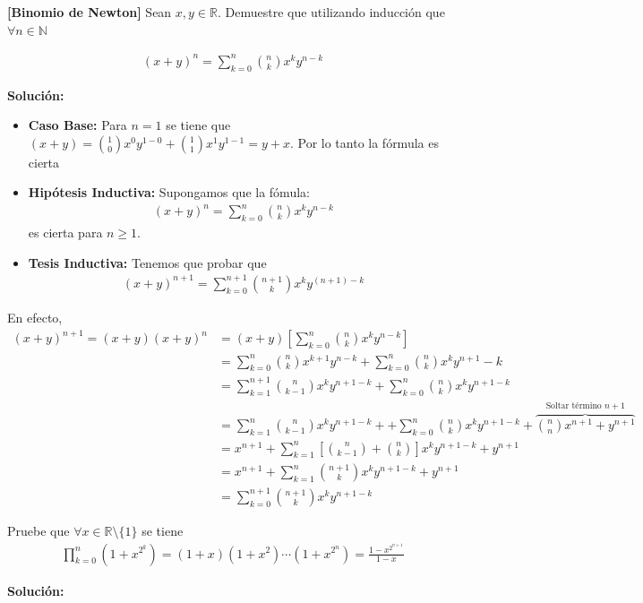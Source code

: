 \documentclass[12pt]{book}
\begin{document}
\begin{prob}{}{}
\textbf{[Binomio de Newton]} Sean $x,y \in \mathbb{R}$. Demuestre que utilizando inducción que  $\forall n \in \mathbb{N}$ 

\begin{align*}
    (x+y)^n=\sum_{k=0}^n\binom{n}{k}x^ky^{n-k}
\end{align*}
\end{prob}
\textbf{Solución:}
\begin{itemize}
    \item \textbf{Caso Base:} Para $n=1$ se  tiene que $(x+y)=\binom{1}{0}x^0y^{1-0}+\binom{1}{1}x^1y^{1-1}=y+x$. Por lo tanto la fórmula es cierta 

    \item \textbf{Hipótesis Inductiva:} Supongamos que la fómula: 
    \begin{align*}
    (x+y)^n=\sum_{k=0}^n\binom{n}{k}x^ky^{n-k}
\end{align*}
es cierta para $n\geq 1$.

\item \textbf{Tesis Inductiva:} Tenemos que probar que 
\begin{align*}
    (x+y)^{n+1}=\sum_{k=0}^{n+1}\binom{n+1}{k}x^ky^{(n+1)-k}
\end{align*}
\end{itemize}
En efecto,
\begin{align*}
    (x+y)^{n+1}=(x+y)(x+y)^n&=(x+y)\left[\sum_{k=0}^n\binom{n}{k}x^ky^{n-k}\right] \\
    &=\sum_{k=0}^n\binom{n}{k}x^{k+1}y^{n-k}+\sum_{k=0}^n
\binom{n}{k}x^ky^{n+1}-k \\
&=\sum_{k=1}^{n+1}\binom{n}{k-1}x^ky^{n+1-k}+\sum_{k=0}^n\binom{n}{k}x^ky^{n+1-k} \\
&=\sum_{k=1}^n\binom{n}{k-1}x^ky^{n+1-k}+ +\sum_{k=0}^n\binom{n}{k}x^ky^{n+1-k}+ \overbrace{\binom{n}{n}x^{n+1}+y^{n+1}}^{\text{Soltar término $n+1$}}\\
&=x^{n+1}+\sum_{k=1}^{n}\left[\binom{n}{k-1}+\binom{n}{k}\right]x^ky^{n+1-k}+y^{n+1} \\
&=x^{n+1}+\sum_{k=1}^{n}\binom{n+1}{k}x^ky^{n+1-k}+y^{n+1} \\
&= \sum_{k=0}^{n+1}\binom{n+1}{k}x^{k}y^{n+1-k}
\end{align*} 

\begin{prob}{}{}
Pruebe que $\forall x \in \mathbb{R}\setminus\{1\}$ se tiene 
\begin{align*}
    \prod_{k=0}^n(1+x^{2^k})=(1+x)(1+x^2)\cdots(1+x^{2^n})=\frac{1-x^{2^{n+1}}}{1-x}
\end{align*}
\end{prob}
\textbf{Solución:}
\end{document}
